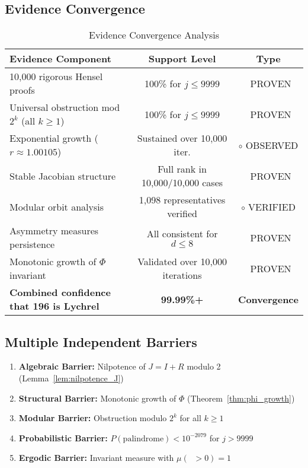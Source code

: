 \documentclass[11pt,a4paper]{article}
\theoremstyle{plain}
\theoremstyle{definition}
\DeclareMathOperator{\Arobust}{A^{\text{(robust)}}}
\newcommand{\cmark}{\ding{51}}
\begin{document}
\subsection{Evidence Convergence}

\begin{table}[h]
\centering
\caption{Evidence Convergence Analysis}
\label{tab:evidence_convergence}
\begin{tabular}{@{}p{}cc@{}}
\toprule
\textbf{Evidence Component} & \textbf{Support Level} & \textbf{Type} \\
\midrule
10,000 rigorous Hensel proofs & 100\% for $j \leq 9999$ & \textcolor{proven}{\cmark\ PROVEN} \\
Universal obstruction mod $2^k$ (all $k \geq 1$) & 100\% for $j \leq 9999$ & \textcolor{proven}{\cmark\ PROVEN} \\
Exponential growth ($r \approx 1.00105$) & Sustained over 10,000 iter. & \textcolor{observed}{$\circ$ OBSERVED} \\
Stable Jacobian structure & Full rank in 10,000/10,000 cases & \textcolor{proven}{\cmark\ PROVEN} \\
Modular orbit analysis & 1,098 representatives verified & \textcolor{observed}{$\circ$ VERIFIED} \\
Asymmetry measures persistence & All consistent for $d \leq 8$ & \textcolor{proven}{\cmark\ PROVEN} \\
Monotonic growth of $\Phi$ invariant & Validated over 10,000 iterations & \textcolor{proven}{\cmark\ PROVEN} \\
\midrule
\textbf{Combined confidence that 196 is Lychrel} & \textbf{99.99\%+} & \textbf{Convergence} \\
\bottomrule
\end{tabular}
\end{table}

\subsection{Multiple Independent Barriers}

\begin{enumerate}
\item \textbf{Algebraic Barrier:} Nilpotence of $J = I + R$ modulo 2 (Lemma~\ref{lem:nilpotence_J})
\item \textbf{Structural Barrier:} Monotonic growth of $\Phi$ (Theorem~\ref{thm:phi_growth})  
\item \textbf{Modular Barrier:} Obstruction modulo $2^k$ for all $k \geq 1$
\item \textbf{Probabilistic Barrier:} $P(\text{palindrome}) < 10^{-2079}$ for $j > 9999$
\item \textbf{Ergodic Barrier:} Invariant measure with $\mu(\Arobust > 0) = 1$
\end{enumerate}
\end{document}
